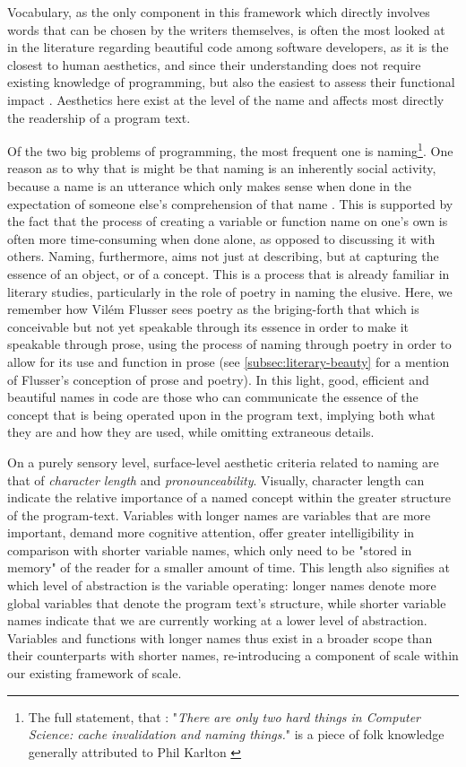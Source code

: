 Vocabulary, as the only component in this framework which directly involves words that can be chosen by the writers themselves, is often the most looked at in the literature regarding beautiful code among software developers, as it is the closest to human aesthetics, and since their understanding does not require existing knowledge of programming, but also the easiest to assess their functional impact \citep{oliveira_systematic_2022}. Aesthetics here exist at the level of the name and affects most directly the readership of a program text.

Of the two big problems of programming, the most frequent one is naming\footnote{The full statement, that : "\emph{There are only two hard things in Computer Science: cache invalidation and naming things.}" is a piece of folk knowledge generally attributed to Phil Karlton \citep{fowler_twohardthings_2009}}. One reason as to why that is might be that naming is an inherently social activity, because a name is an utterance which only makes sense when done in the expectation of someone else's comprehension of that name \citep{voloshinov_marxism_1986}. This is supported by the fact that the process of creating a variable or function name on one's own is often more time-consuming when done alone, as opposed to discussing it with others. Naming, furthermore, aims not just at describing, but at capturing the essence of an object, or of a concept. This is a process that is already familiar in literary studies, particularly in the role of poetry in naming the elusive. Here, we remember how Vilém Flusser sees poetry as the briging-forth that which is conceivable but not yet speakable through its essence in order to make it speakable through prose, using the process of naming through poetry in order to allow for its use and function in prose (see \ref{subsec:literary-beauty} for a mention of Flusser's conception of prose and poetry). In this light, good, efficient and beautiful names in code are those who can communicate the essence of the concept that is being operated upon in the program text, implying both what they are and how they are used, while omitting extraneous details.

On a purely sensory level, surface-level aesthetic criteria related to naming are that of \emph{character length} and \emph{pronounceability}. Visually, character length can indicate the relative importance of a named concept within the greater structure of the program-text. Variables with longer names are variables that are more important, demand more cognitive attention, offer greater intelligibility in comparison with shorter variable names, which only need to be "stored in memory" of the reader for a smaller amount of time. This length also signifies at which level of abstraction is the variable operating: longer names denote more global variables that denote the program text's structure, while shorter variable names indicate that we are currently working at a lower level of abstraction. Variables and functions with longer names thus exist in a broader scope than their counterparts with shorter names, re-introducing a component of scale within our existing framework of scale.

